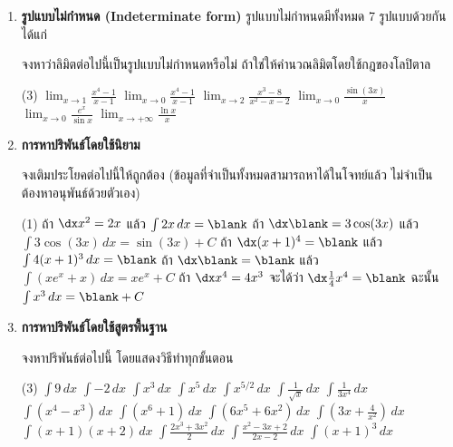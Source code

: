 \begin{enumerate}
\item \textbf{รูปแบบไม่กำหนด (Indeterminate form)}
รูปแบบไม่กำหนดมีทั้งหมด 7 รูปแบบด้วยกัน ได้แก่
\begin{figure}[h!]
\centering
{}
\end{figure}

จงหาว่าลิมิตต่อไปนี้เป็นรูปแบบไม่กำหนดหรือไม่ ถ้าใช่ให้คำนวณลิมิตโดยใช้กฎของโลปิตาล

\begin{tasks}[after-skip = 120pt, after-item-skip = 120pt](3)
\task $\lim_{x \rightarrow 1} \frac{x^4-1}{x-1}$
\task $\lim_{x \rightarrow 0} \frac{x^4-1}{x-1}$
\task $\lim_{x \rightarrow 2} \frac{x^3-8}{x^2-x-2}$
\task $\lim_{x \rightarrow 0} \frac{\sin (3x)}{x}$
\task $\lim_{x \rightarrow 0} \frac{e^x}{\sin x}$
\task $\lim_{x \rightarrow +\infty} \frac{\ln x}{x}$
\end{tasks}

\item \textbf{การหาปริพันธ์โดยใช้นิยาม}

จงเติมประโยคต่อไปนี้ให้ถูกต้อง (ข้อมูลที่จำเป็นทั้งหมดสามารถหาได้ในโจทย์แล้ว ไม่จำเป็นต้องหาอนุพันธ์ด้วยตัวเอง)

\begin{tasks}(1)
\task ถ้า $\dx x^2 = 2x$ แล้ว $\int 2x\,dx = \blank$
\task ถ้า $\dx \blank = 3\cos(3x)$ แล้ว $\int 3 \cos(3x) \, dx = \sin (3x) + C$
\task ถ้า $\dx (x+1)^4 = \blank$ แล้ว $\int 4(x+1)^3 \, dx = \blank$
\task ถ้า $\dx\blank = \blank $ แล้ว $\int (xe^x+x) \, dx = xe^x + C$
\task ถ้า $\dx x^4 = 4x^3$ จะได้ว่า $\dx \frac{1}{4}x^4 = \blank$ ฉะนั้น $\int x^3 \,dx = \blank + C$
\end{tasks}

\newpage
\item \textbf{การหาปริพันธ์โดยใช้สูตรพื้นฐาน}

จงหาปริพันธ์ต่อไปนี้ โดยแสดงวิธีทำทุกขั้นตอน
\begin{tasks}[after-skip = 100pt, after-item-skip = 100pt](3)
\task $\int 9 \, dx$
\task $\int -2 \, dx$
\task $\int x^3 \, dx$
\task $\int x^5 \, dx$
\task $\int x^{5/2} \, dx$
\task $\int \frac{1}{\sqrt{x}} \, dx$
\task $\int \frac{1}{3x^4} \, dx$
\task $\int (x^4 - x^3) \, dx$
\task $\int (x^6 + 1) \, dx$
\task $\int (6x^5 + 6x^2) \, dx$
\task $\int \left(3x + \frac{4}{x^2}\right) \, dx$
\task $\int (x+1)(x+2) \, dx$
\task $\int \frac{2x^3+3x^2}{2} \, dx$
\task $\int \frac{x^2-3x+2}{2x-2} \, dx$
\task $\int (x+1)^3 \, dx$
\end{tasks}

\end{enumerate}

